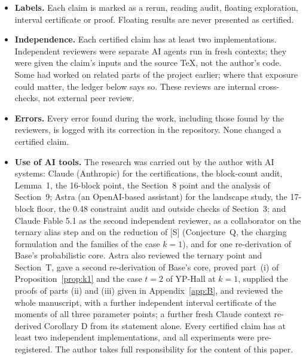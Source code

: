 \documentclass[11pt]{article}
\theoremstyle{plain}
\begin{document}
\begin{itemize}
\item \textbf{Labels.} Each claim is marked as a rerun, reading audit, floating exploration, interval certificate or proof. Floating results are never presented as certified.
\item \textbf{Independence.} Each certified claim has at least two implementations. Independent reviewers were separate AI agents run in fresh contexts; they were given the claim's inputs and the source \TeX, not the author's code. Some had worked on related parts of the project earlier; where that exposure could matter, the ledger below says so. These reviews are internal cross-checks, not external peer review.
\item \textbf{Errors.} Every error found during the work, including those found by the reviewers, is logged with its correction in the repository. None changed a certified claim.
\item \textbf{Use of AI tools.} The research was carried out by the author with AI systems: Claude (Anthropic) for the certifications, the block-count audit, Lemma~1, the 16-block point, the Section~8 point and the analysis of Section~9; Astra (an OpenAI-based assistant) for the landscape study, the 17-block floor, the 0.48 constraint audit and outside checks of Section~3; and Claude Fable 5.1 as the second independent reviewer, as a collaborator on the ternary alias step and on the reduction of [S] (Conjecture~Q, the charging formulation and the families of the case $k = 1$), and for one re-derivation of Base's probabilistic core. Astra also reviewed the ternary point and Section~T, gave a second re-derivation of Base's core, proved part~(i) of Proposition~\ref{prop:k1} and the case $t = 2$ of YP-Hall at $k = 1$, supplied the proofs of parts (ii) and (iii) given in Appendix~\ref{app:B}, and reviewed the whole manuscript, with a further independent interval certificate of the moments of all three parameter points; a further fresh Claude context re-derived Corollary D from its statement alone. Every certified claim has at least two independent implementations, and all experiments were pre-registered. The author takes full responsibility for the content of this paper.

\end{itemize}
\end{document}
